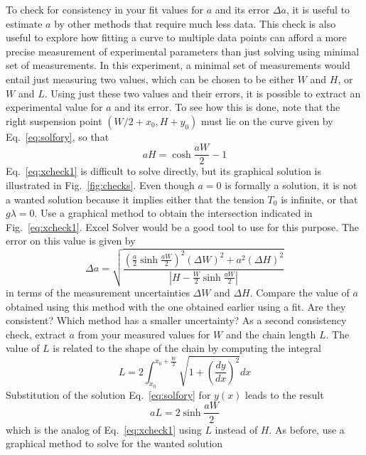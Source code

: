 \documentclass{revtex4}
\begin{document}
To check for consistency in your fit values for $a$ and its error $\Delta a$,
it is useful to estimate $a$ by other methods that require much less data. This
check is also useful to explore how fitting a curve to multiple data points can
afford a more precise measurement of experimental parameters than just solving
using minimal set of measurements. In this experiment, a minimal set of
measurements would entail just measuring two values, which can be chosen to be
either $W$ and $H$, or $W$ and $L$.  Using just these two values and their
errors, it is possible to extract an experimental value for $a$ and its error.
To see how this is done, note that the right suspension point
$(W/2+x_0,H+y_0)$ must lie on the curve given by Eq.~\ref{eq:solfory}, so that
\begin{equation}
aH = \cosh{\frac{aW}{2}}-1
\label{eq:xcheck1}
\end{equation}
Eq.~\ref{eq:xcheck1} is difficult to solve directly, but its graphical solution
is illustrated in Fig.~\ref{fig:checks}. Even though $a = 0$ is formally a
solution, it is not a wanted solution because it implies either that the
tension $T_0$ is infinite, or that $g\lambda = 0$. Use a graphical method
to obtain the intersection indicated in Fig.~\ref{eq:xcheck1}. Excel Solver
would be a good tool to use for this purpose.  The error on
this value is given by
\begin{equation}
\Delta a = \sqrt{\frac{\left(\frac{a}{2}\sinh{\frac{aW}{2}}\right)^2
(\Delta W)^2 + a^2(\Delta H)^2}
{\left| H-\frac{W}{2}\sinh{\frac{aW}{2}}\right|}}
\label{eq:xcheck1err}
\end{equation}
in terms of the measurement uncertainties $\Delta W$ and $\Delta H$.
Compare the value of $a$ obtained using this method with the one obtained
earlier using a fit. Are they consistent? Which method has a smaller
uncertainty?  As a second consistency check, extract $a$ from your
measured values for $W$ and the chain length $L$. The value of $L$
is related to the shape of the chain by computing the integral
\begin{equation}
L=2\int_{x_0}^{x_0+\frac{W}{2}}\sqrt{1+\left(\frac{dy}{dx}\right)^2} dx
\label{eq:lengthint}
\end{equation}
Substitution of the solution Eq.~\ref{eq:solfory} for $y(x)$ leads to the
result
\begin{equation}
aL = 2\sinh{\frac{aW}{2}}
\label{eq:xcheck2}
\end{equation}
which is the analog of Eq.~\ref{eq:xcheck1} using $L$ instead of $H$.
As before, use a graphical method to solve for the wanted solution
\end{document}
